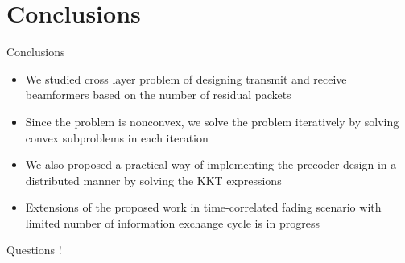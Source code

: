 \documentclass[9pt]{beamer}
\begin{document}
%


\section{Conclusions}

\begin{frame}{Conclusions}
\begin{itemize}
\item We studied cross layer problem of designing transmit and receive beamformers based on the number of residual packets
\item Since the problem is nonconvex, we solve the problem iteratively by solving convex subproblems in each iteration
\item We also proposed a practical way of implementing the precoder design in a distributed manner by solving the \ac{KKT} expressions
\item Extensions of the proposed work in time-correlated fading scenario with limited number of information exchange cycle is in progress
\end{itemize}
\end{frame}


\begin{frame}
\begin{center}
{\color{blue}\Huge{Questions !}}
\end{center}
\end{frame}
\end{document}
